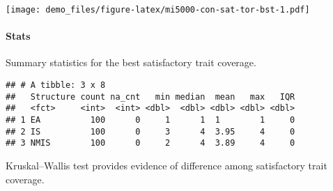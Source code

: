 \documentclass[]{book}
\newenvironment{Shaded}{\begin{snugshade}}{\end{snugshade}}
\newcommand{\CharTok}[1]{\textcolor[rgb]{0.31,0.60,0.02}{#1}}
\newcommand{\CommentTok}[1]{\textcolor[rgb]{0.56,0.35,0.01}{\textit{#1}}}
\newcommand{\DataTypeTok}[1]{\textcolor[rgb]{0.13,0.29,0.53}{#1}}
\newcommand{\KeywordTok}[1]{\textcolor[rgb]{0.13,0.29,0.53}{\textbf{#1}}}
\newcommand{\NormalTok}[1]{#1}
\newcommand{\OperatorTok}[1]{\textcolor[rgb]{0.81,0.36,0.00}{\textbf{#1}}}
\newcommand{\OtherTok}[1]{\textcolor[rgb]{0.56,0.35,0.01}{#1}}
\newcommand{\StringTok}[1]{\textcolor[rgb]{0.31,0.60,0.02}{#1}}
\let\oldparagraph\paragraph
\renewcommand{\paragraph}[1]{\oldparagraph{#1}\mbox{}}
\begin{document}
\texttt{[image: demo\_files/figure-latex/mi5000-con-sat-tor-bst-1.pdf]}

\hypertarget{stats-67}{%
\paragraph{Stats}\label{stats-67}}

Summary statistics for the best satisfactory trait coverage.

\begin{Shaded}
\end{Shaded}

\begin{verbatim}
## # A tibble: 3 x 8
##   Structure count na_cnt   min median  mean   max   IQR
##   <fct>     <int>  <int> <dbl>  <dbl> <dbl> <dbl> <dbl>
## 1 EA          100      0     1      1  1        1     0
## 2 IS          100      0     3      4  3.95     4     0
## 3 NMIS        100      0     2      4  3.89     4     0
\end{verbatim}

Kruskal--Wallis test provides evidence of difference among satisfactory trait coverage.
\end{document}
